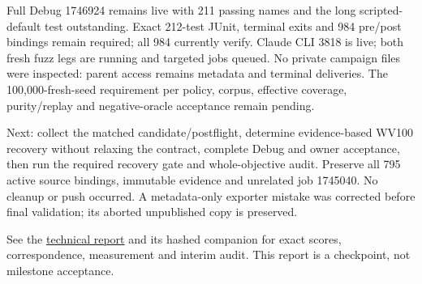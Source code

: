 \documentclass[11pt]{article}
\begin{document}
Full Debug 1746924 remains live with 211 passing names and the long
scripted-default test outstanding. Exact 212-test JUnit, terminal exits and
984 pre/post bindings remain required; all 984 currently verify. Claude CLI
3818 is live; both fresh fuzz legs are running and targeted jobs queued.
No private campaign files were inspected: parent access remains metadata and
terminal deliveries. The 100,000-fresh-seed requirement per policy, corpus,
effective coverage, purity/replay and negative-oracle acceptance remain pending.

Next: collect the matched candidate/postflight, determine evidence-based WV100
recovery without relaxing the contract, complete Debug and owner acceptance,
then run the required recovery gate and whole-objective audit. Preserve all
795 active source bindings, immutable evidence and unrelated job 1745040.
No cleanup or push occurred. A metadata-only exporter mistake was corrected
before final validation; its aborted unpublished copy is preserved.

See the
\href{../../benchmarks/reports/2026-10-03-terminal-substitute-regression-loss.md}{technical report}
and its hashed companion for exact scores, correspondence, measurement and
interim audit. This report is a checkpoint, not milestone acceptance.
\end{document}
